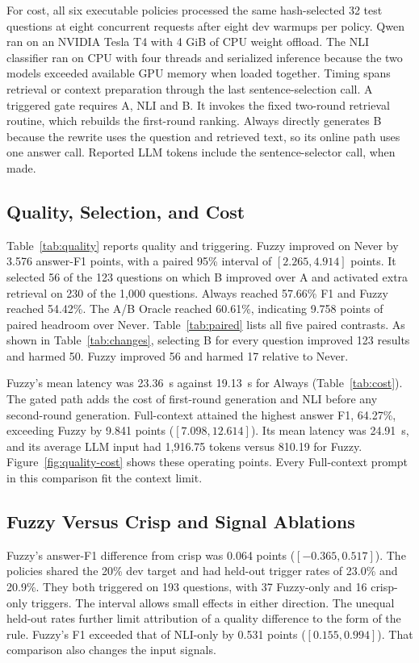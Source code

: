 For cost, all six executable policies processed the same hash-selected 32 test questions at eight concurrent requests after eight dev warmups per policy. Qwen ran on an NVIDIA Tesla T4 with 4 GiB of CPU weight offload. The NLI classifier ran on CPU with four threads and serialized inference because the two models exceeded available GPU memory when loaded together. Timing spans retrieval or context preparation through the last sentence-selection call. A triggered gate requires A, NLI and B. It invokes the fixed two-round retrieval routine, which rebuilds the first-round ranking. Always directly generates B because the rewrite uses the question and retrieved text, so its online path uses one answer call. Reported LLM tokens include the sentence-selector call, when made.



\subsection{Quality, Selection, and Cost}
Table~\ref{tab:quality} reports quality and triggering. Fuzzy improved on Never by 3.576 answer-F1 points, with a paired 95\% interval of $[2.265,4.914]$ points. It selected 56 of the 123 questions on which B improved over A and activated extra retrieval on 230 of the 1,000 questions. Always reached 57.66\% F1 and Fuzzy reached 54.42\%. The A/B Oracle reached 60.61\%, indicating 9.758 points of paired headroom over Never. Table~\ref{tab:paired} lists all five paired contrasts. As shown in Table~\ref{tab:changes}, selecting B for every question improved 123 results and harmed 50. Fuzzy improved 56 and harmed 17 relative to Never.

Fuzzy's mean latency was 23.36~s against 19.13~s for Always (Table~\ref{tab:cost}). The gated path adds the cost of first-round generation and NLI before any second-round generation. Full-context attained the highest answer F1, 64.27\%, exceeding Fuzzy by 9.841 points ($[7.098,12.614]$). Its mean latency was 24.91~s, and its average LLM input had 1,916.75 tokens versus 810.19 for Fuzzy. Figure~\ref{fig:quality-cost} shows these operating points. Every Full-context prompt in this comparison fit the context limit.

\subsection{Fuzzy Versus Crisp and Signal Ablations}
Fuzzy's answer-F1 difference from crisp was 0.064 points ($[-0.365,0.517]$). The policies shared the 20\% dev target and had held-out trigger rates of 23.0\% and 20.9\%. They both triggered on 193 questions, with 37 Fuzzy-only and 16 crisp-only triggers. The interval allows small effects in either direction. The unequal held-out rates further limit attribution of a quality difference to the form of the rule. Fuzzy's F1 exceeded that of NLI-only by 0.531 points ($[0.155,0.994]$). That comparison also changes the input signals.

